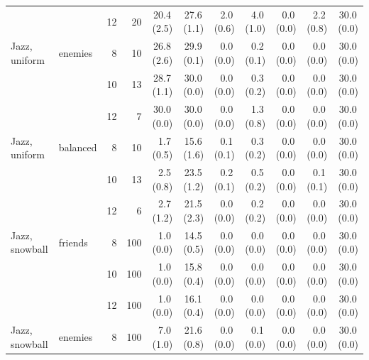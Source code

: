 \begin{table}[p]
{\begin{tabular}{llrrrrrrrrr}
 &  & 12 & 20 & 20.4\,{\scriptsize(2.5)} & 27.6\,{\scriptsize(1.1)} & 2.0\,{\scriptsize(0.6)} & 4.0\,{\scriptsize(1.0)} & 0.0\,{\scriptsize(0.0)} & 2.2\,{\scriptsize(0.8)} & 30.0\,{\scriptsize(0.0)} \\
\addlinespace[1pt]
Jazz, uniform & enemies & 8 & 10 & 26.8\,{\scriptsize(2.6)} & 29.9\,{\scriptsize(0.1)} & 0.0\,{\scriptsize(0.0)} & 0.2\,{\scriptsize(0.1)} & 0.0\,{\scriptsize(0.0)} & 0.0\,{\scriptsize(0.0)} & 30.0\,{\scriptsize(0.0)} \\
 &  & 10 & 13 & 28.7\,{\scriptsize(1.1)} & 30.0\,{\scriptsize(0.0)} & 0.0\,{\scriptsize(0.0)} & 0.3\,{\scriptsize(0.2)} & 0.0\,{\scriptsize(0.0)} & 0.0\,{\scriptsize(0.0)} & 30.0\,{\scriptsize(0.0)} \\
 &  & 12 & 7 & 30.0\,{\scriptsize(0.0)} & 30.0\,{\scriptsize(0.0)} & 0.0\,{\scriptsize(0.0)} & 1.3\,{\scriptsize(0.8)} & 0.0\,{\scriptsize(0.0)} & 0.0\,{\scriptsize(0.0)} & 30.0\,{\scriptsize(0.0)} \\
\addlinespace[1pt]
Jazz, uniform & balanced & 8 & 10 & 1.7\,{\scriptsize(0.5)} & 15.6\,{\scriptsize(1.6)} & 0.1\,{\scriptsize(0.1)} & 0.3\,{\scriptsize(0.2)} & 0.0\,{\scriptsize(0.0)} & 0.0\,{\scriptsize(0.0)} & 30.0\,{\scriptsize(0.0)} \\
 &  & 10 & 13 & 2.5\,{\scriptsize(0.8)} & 23.5\,{\scriptsize(1.2)} & 0.2\,{\scriptsize(0.1)} & 0.5\,{\scriptsize(0.2)} & 0.0\,{\scriptsize(0.0)} & 0.1\,{\scriptsize(0.1)} & 30.0\,{\scriptsize(0.0)} \\
 &  & 12 & 6 & 2.7\,{\scriptsize(1.2)} & 21.5\,{\scriptsize(2.3)} & 0.0\,{\scriptsize(0.0)} & 0.2\,{\scriptsize(0.2)} & 0.0\,{\scriptsize(0.0)} & 0.0\,{\scriptsize(0.0)} & 30.0\,{\scriptsize(0.0)} \\
\midrule
Jazz, snowball & friends & 8 & 100 & 1.0\,{\scriptsize(0.0)} & 14.5\,{\scriptsize(0.5)} & 0.0\,{\scriptsize(0.0)} & 0.0\,{\scriptsize(0.0)} & 0.0\,{\scriptsize(0.0)} & 0.0\,{\scriptsize(0.0)} & 30.0\,{\scriptsize(0.0)} \\
 &  & 10 & 100 & 1.0\,{\scriptsize(0.0)} & 15.8\,{\scriptsize(0.4)} & 0.0\,{\scriptsize(0.0)} & 0.0\,{\scriptsize(0.0)} & 0.0\,{\scriptsize(0.0)} & 0.0\,{\scriptsize(0.0)} & 30.0\,{\scriptsize(0.0)} \\
 &  & 12 & 100 & 1.0\,{\scriptsize(0.0)} & 16.1\,{\scriptsize(0.4)} & 0.0\,{\scriptsize(0.0)} & 0.0\,{\scriptsize(0.0)} & 0.0\,{\scriptsize(0.0)} & 0.0\,{\scriptsize(0.0)} & 30.0\,{\scriptsize(0.0)} \\
\addlinespace[1pt]
Jazz, snowball & enemies & 8 & 100 & 7.0\,{\scriptsize(1.0)} & 21.6\,{\scriptsize(0.8)} & 0.0\,{\scriptsize(0.0)} & 0.1\,{\scriptsize(0.0)} & 0.0\,{\scriptsize(0.0)} & 0.0\,{\scriptsize(0.0)} & 30.0\,{\scriptsize(0.0)} \\

\end{tabular}}
\end{table}

